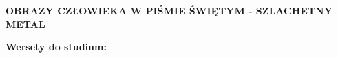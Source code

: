 \documentclass[10pt,a4paper,oneside]{article}
\begin{document}
\centerline{\textbf{\MakeUppercase{Obrazy człowieka w Piśmie Świętym - szlachetny metal}}}
\begin{center}
\textbf{Wersety do studium:} 

\end{center}
\end{document}
